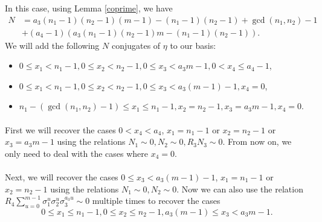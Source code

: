 \documentclass[12pt,a4paper]{article}
\theoremstyle{definition}
\begin{document}
In this case, using Lemma \ref{coprime}, we have
\begin{equation*}
\begin{split}
N&=a_3\left(n_1-1\right)\left(n_2-1\right)\left(m-1\right)-\left(n_1-1\right)\left(n_2-1\right)+\gcd\left(n_1,n_2\right)-1\\
&+(a_4-1)\left(a_3\left(n_1-1\right)\left(n_2-1\right)m-\left(n_1-1\right)\left(n_2-1\right)\right).
\end{split}
\end{equation*}
We will add the following $N$ conjugates of $\eta$ to our basis:
\begin{itemize}
\item $0\leq x_1<n_1-1, 0\leq x_2<n_2-1, 0\leq x_3<a_3m-1, 0<x_4\leq a_4-1$,
\item $0\leq x_1<n_1-1, 0\leq x_2<n_2-1, 0\leq x_3<a_3(m-1)-1, x_4=0$,
\item $n_1-(\gcd\left(n_1,n_2\right)-1)\leq x_1\leq n_1-1, x_2=n_2-1, x_3=a_3m-1, x_4=0$.
\end{itemize}

\paragraph*{}
First we will recover the cases $0<x_4<a_4$, $x_1=n_1-1$ or $x_2=n_2-1$ or $x_3=a_3m-1$ using the relations $N_1\sim 0, N_2\sim 0, R_3N_3\sim 0$. From now on, we only need to deal with the cases where $x_4=0$.
\paragraph*{}
Next, we will recover the cases $0\leq x_3<a_3(m-1)-1$, $x_1=n_1-1$ or $x_2=n_2-1$ using the relations $N_1\sim 0, N_2\sim 0$. Now we can also use the relation $R_4\sum_{u=0}^{m-1}\sigma_1^{u}\sigma_2^{u}\sigma_3^{a_3u}\sim 0$ multiple times to recover the cases $$0\leq x_1\leq n_1-1, 0\leq x_2\leq n_2-1, a_3(m-1)\leq x_3<a_3m-1.$$
\end{document}
